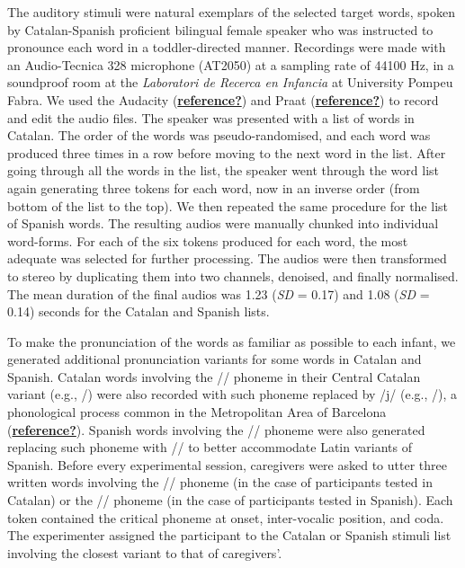 \documentclass[
  letterpaper,
  DIV=11,
  numbers=noendperiod]{scrartcl}
\begin{document}
The auditory stimuli were natural exemplars of the selected target
words, spoken by Catalan-Spanish proficient bilingual female speaker who
was instructed to pronounce each word in a toddler-directed manner.
Recordings were made with an Audio-Tecnica 328 microphone (AT2050) at a
sampling rate of 44100 Hz, in a soundproof room at the \emph{Laboratori
de Recerca en Infancia} at University Pompeu Fabra. We used the Audacity
(\protect\hyperlink{ref-reference}{\textbf{reference?}}) and Praat
(\protect\hyperlink{ref-reference}{\textbf{reference?}}) to record and
edit the audio files. The speaker was presented with a list of words in
Catalan. The order of the words was pseudo-randomised, and each word was
produced three times in a row before moving to the next word in the
list. After going through all the words in the list, the speaker went
through the word list again generating three tokens for each word, now
in an inverse order (from bottom of the list to the top). We then
repeated the same procedure for the list of Spanish words. The resulting
audios were manually chunked into individual word-forms. For each of the
six tokens produced for each word, the most adequate was selected for
further processing. The audios were then transformed to stereo by
duplicating them into two channels, denoised, and finally normalised.
The mean duration of the final audios was 1.23 (\emph{SD} = 0.17) and
1.08 (\emph{SD} = 0.14) seconds for the Catalan and Spanish lists.

To make the pronunciation of the words as familiar as possible to each
infant, we generated additional pronunciation variants for some words in
Catalan and Spanish. Catalan words involving the // phoneme
in their Central Catalan variant (e.g., /) were also
recorded with such phoneme replaced by /j/ (e.g., /), a
phonological process common in the Metropolitan Area of Barcelona
(\protect\hyperlink{ref-reference}{\textbf{reference?}}). Spanish words
involving the // phoneme were also generated replacing such
phoneme with // to better accommodate Latin variants of
Spanish. Before every experimental session, caregivers were asked to
utter three written words involving the // phoneme (in the
case of participants tested in Catalan) or the // phoneme (in
the case of participants tested in Spanish). Each token contained the
critical phoneme at onset, inter-vocalic position, and coda. The
experimenter assigned the participant to the Catalan or Spanish stimuli
list involving the closest variant to that of caregivers'.
\end{document}
